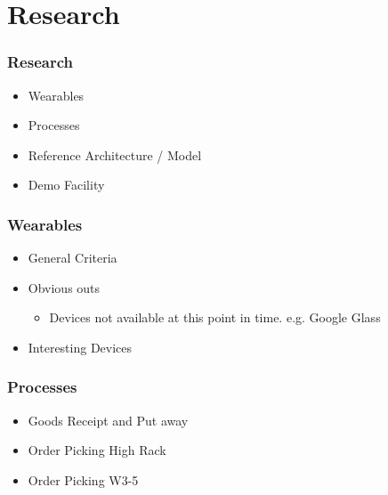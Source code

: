 \section{Research}
\begin{frame}\frametitle{Research}
	\begin{itemize}
		\item Wearables
		\item Processes
		\item Reference Architecture / Model
		\item Demo Facility
	\end{itemize}
\end{frame}

\begin{frame}\frametitle{Wearables}
	\begin{itemize}
		\item General Criteria
		\item Obvious outs
		\begin{itemize}
			\item Devices not available at this point in time. e.g. Google Glass
		\end{itemize}
		\item Interesting Devices
	\end{itemize}
\end{frame}

\begin{frame}\frametitle{Processes}
	\begin{itemize}
		\item Goods Receipt and Put away
		\item Order Picking High Rack
		\item Order Picking W3-5
	\end{itemize}
\end{frame}
